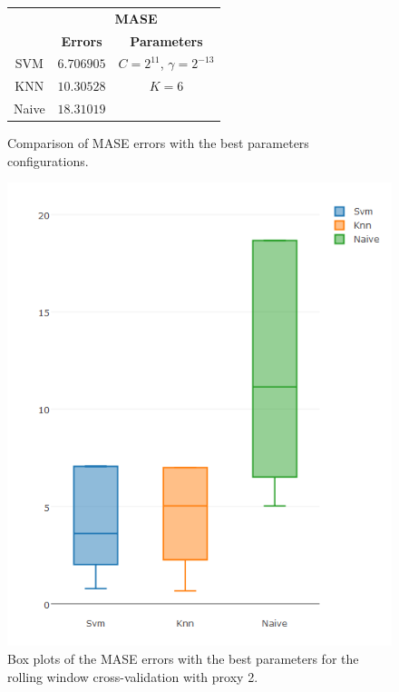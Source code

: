 \begin{figure}[!h]
\centering
\begin{tabular}{|c|c|c|}
   \hline
   & \multicolumn{2}{|c|}{\textbf{MASE}} \\ \cline{2-3}
   & \textbf{Errors} & \textbf{Parameters}          \\ \hline
   SVM  & $6.706905$& $C = 2^{11}$, $\gamma = 2^{-13}$          \\ 
   KNN & $10.30528$ & $K = 6$ \\ 
   Naive & $18.31019$ &      \\ 
   \hline
   \end{tabular}
\caption{Comparison of MASE errors with the best parameters configurations.}
\label{fig:table10yMASEp2}
\centering
\includegraphics[width=\linewidth]{img/10yproxy2MASE.png}
\caption{Box plots of the MASE errors with the best parameters for the rolling window cross-validation with proxy 2.}
\end{figure}
